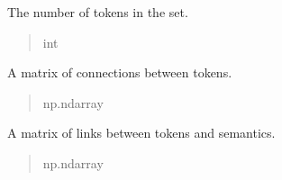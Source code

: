 \documentclass[letterpaper,10pt,english]{sphinxmanual}
\begin{document}
\begin{fulllineitems}

\begin{fulllineitems}
\label{\detokenize{nodes:nodes.nodeBuilder.Token_set.num_tokens}}
\pysigstartsignatures
\pysigline
{}
\pysigstopsignatures
\sphinxAtStartPar
The number of tokens in the set.
\begin{quote}\begin{description}
\sphinxAtStartPar
int

\end{description}\end{quote}

\end{fulllineitems}


\begin{fulllineitems}
\label{\detokenize{nodes:nodes.nodeBuilder.Token_set.connections}}
\pysigstartsignatures
\pysigline
{}
\pysigstopsignatures
\sphinxAtStartPar
A matrix of connections between tokens.
\begin{quote}\begin{description}
\sphinxAtStartPar
np.ndarray

\end{description}\end{quote}

\end{fulllineitems}


\begin{fulllineitems}
\label{\detokenize{nodes:nodes.nodeBuilder.Token_set.links}}
\pysigstartsignatures
\pysigline
{}
\pysigstopsignatures
\sphinxAtStartPar
A matrix of links between tokens and semantics.
\begin{quote}\begin{description}
\sphinxAtStartPar
np.ndarray

\end{description}\end{quote}


\end{fulllineitems}
\end{fulllineitems}
\end{document}
